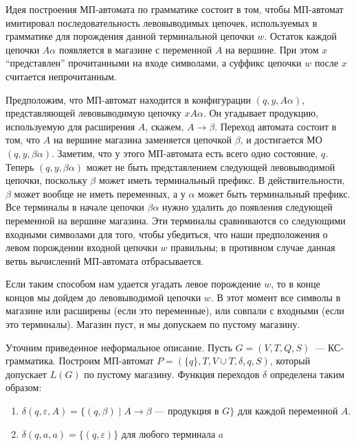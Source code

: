 \documentclass[a4paper,12pt]{article}
\begin{document}
Идея построения МП-автомата по грамматике состоит в том, чтобы МП-автомат имитировал последовательность левовыводимых цепочек, используемых в грамматике для порождения данной терминальной цепочки $w$. Остаток каждой цепочки $A\alpha$ появляется в магазине с переменной $A$ на вершине. При этом $x$ “представлен” прочитанными на входе символами, а суффикс цепочки $w$ после $x$ считается непрочитанным.

Предположим, что МП-автомат находится в конфигурации $(q, y, A\alpha)$, представляющей левовыводимую цепочку $xA\alpha$. Он угадывает продукцию, используемую для расширения $A$, скажем, $A \to \beta$. Переход автомата состоит в том, что $A$ на вершине магазина заменяется цепочкой $\beta$, и достигается МО $(q, y, \beta\alpha)$. Заметим, что у этого МП-автомата есть всего одно состояние, $q$. Теперь $(q, y, \beta\alpha)$ может не быть представлением следующей левовыводимой цепочки, поскольку $\beta$ может иметь терминальный префикс. В действительности, $\beta$ может вообще не иметь переменных, а у $\alpha$ может быть терминальный префикс. Все терминалы в начале цепочки $\beta\alpha$ нужно удалить до появления следующей переменной на вершине магазина. Эти терминалы сравниваются со следующими входными символами для того, чтобы убедиться, что наши предположения о левом порождении входной цепочки $w$ правильны; в противном случае данная ветвь вычислений МП-автомата отбрасывается.

Если таким способом нам удается угадать левое порождение $w$, то в конце концов мы дойдем до левовыводимой цепочки $w$. В этот момент все символы в магазине или расширены (если это переменные), или совпали с входными (если это терминалы). Магазин пуст, и мы допускаем по пустому магазину.

Уточним приведенное неформальное описание. Пусть $G = (V, T, Q, S)$~--- КС-грамматика. Построим МП-автомат $P = (\{q\}, T, V \cup T, \delta, q, S)$, который допускает $L(G)$ по пустому магазину. Функция переходов $\delta$ определена таким образом:
\begin{enumerate}
	\item $\delta(q, \varepsilon, A) = \{(q, \beta) \mid A \to \beta\text{~--- продукция в }G\}$ для каждой переменной $A$.
	\item $\delta(q, a, a) = \{(q, \varepsilon)\}$ для любого терминала $a$
\end{enumerate}
\end{document}
